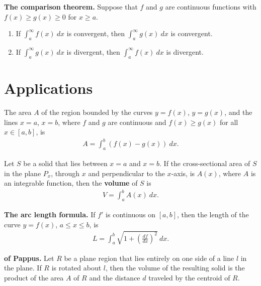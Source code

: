 \documentclass{article}
\begin{document}
\begin{theorem}
	\textbf{The comparison theorem.} Suppose that $f$ and $g$ are continuous functions with $f(x)\geq g(x)\geq 0$ for $x\geq a$.
	\begin{enumerate}
		\item If $\int_a^\infty f(x)\:dx$ is convergent, then $\int_a^\infty g(x)\:dx$ is convergent.
		\item If $\int_a^\infty g(x)\:dx$ is divergent, then $\int_a^\infty f(x)\:dx$ is divergent.
	\end{enumerate}
\end{theorem}
\section{Applications}
\begin{definition}
	The area $A$ of the region bounded by the curves $y=f(x)$, $y=g(x)$, and the lines $x=a$, $x=b$, where $f$ and $g$ are continuous and $f(x)\geq g(x)$ for all $x\in[a,b]$, is
	\begin{align*}
		A=\int_a^b \left(f(x)-g(x)\right)\:dx.
	\end{align*}
\end{definition}
\begin{definition}
	Let $S$ be a solid that lies between $x=a$ and $x=b$. If the cross-sectional area of $S$ in the plane $P_x$, through $x$ and perpendicular to the $x$-axis, is $A(x)$, where $A$ is an integrable function, then the \textbf{volume} of $S$ is
	\begin{align*}
		V=\int_a^b A(x)\:dx.
	\end{align*}
\end{definition}
\begin{theorem}
	\textbf{The arc length formula.} If $f'$ is continuous on $[a,b]$, then the length of the curve $y=f(x)$, $a\leq x \leq b$, is
	\begin{align*}
		L = \int_a^b \sqrt{1+\left(\frac{df}{dx}\right)^2}\:dx.
	\end{align*}
\end{theorem}
\begin{theorem}
	\textbf{of Pappus.} Let $R$ be a plane region that lies entirely on one side of a line $l$ in the plane.
	If $R$ is rotated about $l$, then the volume of the resulting solid is the product of the area $A$ of $R$ and the distance $d$ traveled by the centroid of $R$.
\end{theorem}
\end{document}
